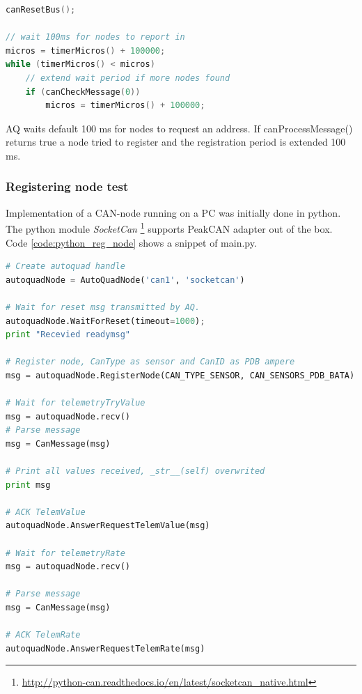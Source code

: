 \begin{lstlisting}[language = c, caption = Snippet showing AQ waits for devices, label=code:aq_req_extend_time]
canResetBus();

// wait 100ms for nodes to report in
micros = timerMicros() + 100000;
while (timerMicros() < micros)
    // extend wait period if more nodes found
    if (canCheckMessage(0))
        micros = timerMicros() + 100000;
\end{lstlisting}

AQ waits default 100 ms for nodes to request an address. If canProcessMessage() returns true a node tried to register and the registration period is extended 100 ms.
 
\subsubsection{Registering node test} \label{app:reg_node_test}
Implementation of a CAN-node running on a PC was initially done in python. The python module \textit{SocketCan} \footnote{\url{http://python-can.readthedocs.io/en/latest/socketcan_native.html}} supports PeakCAN adapter out of the box.\\

Code \ref{code:python_reg_node} shows a snippet of main.py.

\begin{lstlisting}[language = python, caption = Snippet showing AQ registration from python, label=code:python_reg_node]
# Create autoquad handle
autoquadNode = AutoQuadNode('can1', 'socketcan')

# Wait for reset msg transmitted by AQ.
autoquadNode.WaitForReset(timeout=1000);
print "Recevied readymsg"

# Register node, CanType as sensor and CanID as PDB ampere
msg = autoquadNode.RegisterNode(CAN_TYPE_SENSOR, CAN_SENSORS_PDB_BATA)

# Wait for telemetryTryValue
msg = autoquadNode.recv()
# Parse message
msg = CanMessage(msg)

# Print all values received, _str__(self) overwrited
print msg

# ACK TelemValue
autoquadNode.AnswerRequestTelemValue(msg)

# Wait for telemetryRate
msg = autoquadNode.recv()

# Parse message
msg = CanMessage(msg)

# ACK TelemRate
autoquadNode.AnswerRequestTelemRate(msg)
\end{lstlisting}

